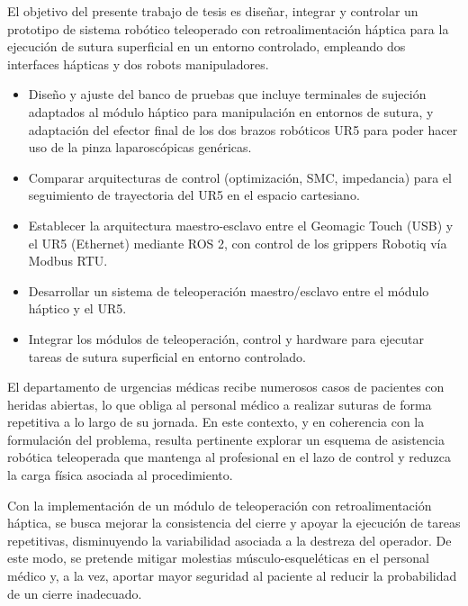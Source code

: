 
El objetivo del presente trabajo de tesis es diseñar, integrar y controlar un
prototipo de sistema robótico teleoperado con retroalimentación háptica para la
ejecución de sutura superficial en un entorno controlado, empleando dos
interfaces hápticas y dos robots manipuladores.


\begin{itemize}
      \item {Diseño y ajuste del banco de pruebas que incluye terminales de
            sujeción adaptados al módulo háptico para manipulación en entornos de sutura, y
            adaptación del efector final de los dos brazos robóticos UR5 para poder hacer
            uso de la pinza laparoscópicas genéricas.} %
      \item {Comparar arquitecturas de control (optimización, SMC, impedancia)
            para el seguimiento de trayectoria del UR5 en el espacio cartesiano.}
      \item {Establecer la arquitectura maestro-esclavo entre el Geomagic Touch
            (USB) y el UR5 (Ethernet) mediante ROS 2, con control de los grippers Robotiq
            vía Modbus RTU.}%
      \item {Desarrollar un sistema de teleoperación maestro/esclavo entre el
            módulo háptico y el UR5.} %
      \item {Integrar los módulos de teleoperación, control y hardware para
            ejecutar tareas de sutura superficial en entorno controlado.}

\end{itemize}


El departamento de urgencias médicas recibe numerosos casos de pacientes con
heridas abiertas, lo que obliga al personal médico a realizar suturas de forma
repetitiva a lo largo de su jornada. En este contexto, y en coherencia con la
formulación del problema, resulta pertinente explorar un esquema de asistencia
robótica teleoperada que mantenga al profesional en el lazo de control y
reduzca la carga física asociada al procedimiento.

Con la implementación de un módulo de teleoperación con retroalimentación
háptica, se busca mejorar la consistencia del cierre y apoyar la ejecución de
tareas repetitivas, disminuyendo la variabilidad asociada a la destreza del
operador. De este modo, se pretende mitigar molestias músculo-esqueléticas en
el personal médico y, a la vez, aportar mayor seguridad al paciente al reducir
la probabilidad de un cierre inadecuado.

